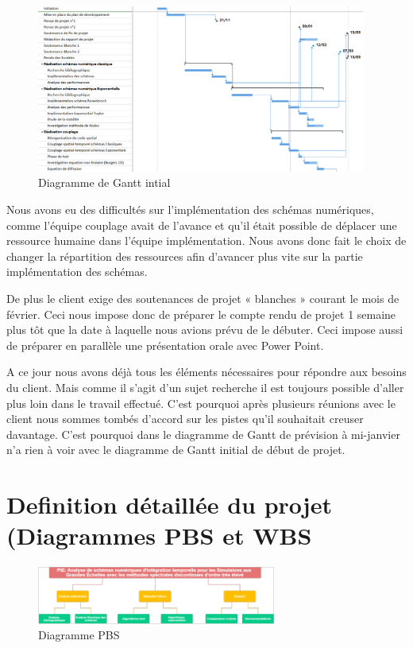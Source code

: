 \documentclass[a4paper,12pt]{report}
\theoremstyle{break}
\begin{document}
  \begin{figure}[h]
\centering
    \includegraphics[width=\textwidth, height=5.5cm]{images/Gantt_revue_2.png}
  	\caption{Diagramme de Gantt intial} 
   \label{fig:Gantt_initial}
\end{figure}

Nous avons eu des difficultés sur l’implémentation des schémas numériques, comme l’équipe couplage avait de l’avance et qu’il était possible de déplacer une ressource humaine dans l’équipe implémentation. Nous avons donc fait le choix de changer la répartition des ressources afin d’avancer plus vite sur la partie implémentation des schémas. 

De plus le client exige des soutenances de projet « blanches » courant le mois de février. Ceci nous impose donc de préparer le compte rendu de projet 1 semaine plus tôt que la date à laquelle nous avions prévu de le débuter. Ceci impose aussi de préparer en parallèle une présentation orale avec Power Point.

A ce jour nous avons déjà tous les éléments nécessaires pour répondre aux besoins du client. Mais comme il s’agit d’un sujet recherche il est toujours possible d’aller plus loin dans le travail effectué. C’est pourquoi après plusieurs réunions avec le client nous sommes tombés d’accord sur les pistes qu’il souhaitait creuser davantage. C’est pourquoi dans le diagramme de Gantt de prévision à mi-janvier n’a rien à voir avec le diagramme de Gantt initial de début de projet. 



\chapter{Definition détaillée du projet (Diagrammes PBS et WBS}

\begin{figure}
     \centering
      \includegraphics[width=0.7\textwidth]{images/PBS.png}
       \caption{Diagramme PBS}
    \label{chaine optim}
\end{figure}
    
\end{document}

